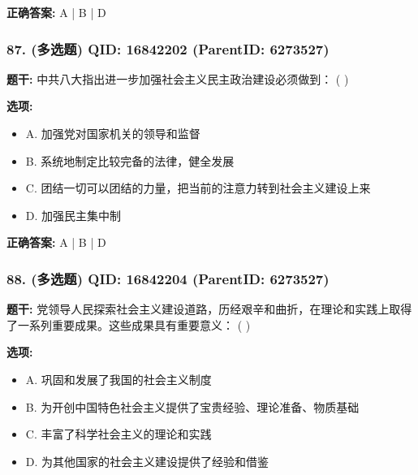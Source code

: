 \documentclass[12pt,UTF8]{ctexart}
\begin{document}
\textbf{正确答案:}
A | B | D

\vspace{0.3em}\hrulefill\vspace{0.7em}

\subsubsection*{87. (多选题) \small QID: 16842202 (ParentID: 6273527)}

\textbf{题干:}
中共八大指出进一步加强社会主义民主政治建设必须做到： ( )



\textbf{选项:}
\begin{itemize}[leftmargin=*]

  \item A. 加强党对国家机关的领导和监督

  \item B. 系统地制定比较完备的法律，健全发展

  \item C. 团结一切可以团结的力量，把当前的注意力转到社会主义建设上来

  \item D. 加强民主集中制

\end{itemize}

\textbf{正确答案:}
A | B | D

\vspace{0.3em}\hrulefill\vspace{0.7em}

\subsubsection*{88. (多选题) \small QID: 16842204 (ParentID: 6273527)}

\textbf{题干:}
党领导人民探索社会主义建设道路，历经艰辛和曲折，在理论和实践上取得了一系列重要成果。这些成果具有重要意义： ( )



\textbf{选项:}
\begin{itemize}[leftmargin=*]

  \item A. 巩固和发展了我国的社会主义制度

  \item B. 为开创中国特色社会主义提供了宝贵经验、理论准备、物质基础

  \item C. 丰富了科学社会主义的理论和实践

  \item D. 为其他国家的社会主义建设提供了经验和借鉴

\end{itemize}
\end{document}
